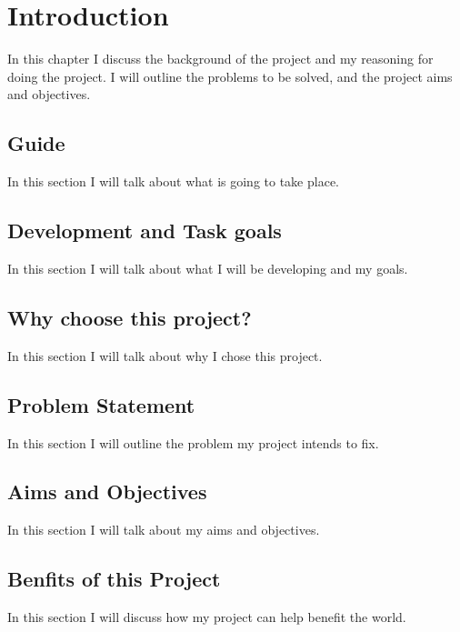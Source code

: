 

\chapter{Introduction} \label{sec:introduction}
In this chapter I discuss the background of the project and my reasoning for doing the project. I will outline the problems to be solved, and the project aims and objectives.

\section{Guide}
In this section I will talk about what is going to take place.

\section{Development and Task goals}
In this section I will talk about what I will be developing and my goals.

\section{Why choose this project?}
In this section I will talk about why I chose this project.

\section{Problem Statement}
In this section I will outline the problem my project intends to fix.

\section{Aims and Objectives}
In this section I will talk about my aims and objectives. 

\section{Benfits of this Project}
In this section I will discuss how my project can help benefit the world.

